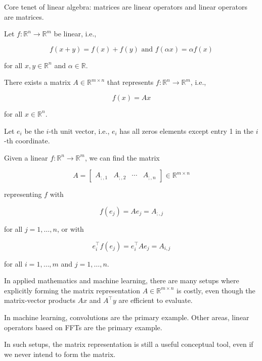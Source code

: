 \documentclass{report}
\begin{document}
\begin{concept}
    Core tenet of linear algebra: matrices are linear operators and linear operators are matrices.

    Let $f: \mathbb{R}^{n} \rightarrow \mathbb{R}^{m}$ be linear, i.e.,

    $$
    f(x+y)=f(x)+f(y) \text { and } f(\alpha x)=\alpha f(x)
    $$

    for all $x, y \in \mathbb{R}^{n}$ and $\alpha \in \mathbb{R}$.

    There exists a matrix $A \in \mathbb{R}^{m \times n}$ that represents $f: \mathbb{R}^{n} \rightarrow \mathbb{R}^{m}$, i.e.,

    $$
    f(x)=A x
    $$

    for all $x \in \mathbb{R}^{n}$.

    Let $e_{i}$ be the $i$-th unit vector, i.e., $e_{i}$ has all zeros elements except entry 1 in the $i$-th coordinate.

    Given a linear $f: \mathbb{R}^{n} \rightarrow \mathbb{R}^{m}$, we can find the matrix

    $$
    A=\left[\begin{array}{llll}
    A_{;, 1} & A_{;, 2} & \cdots & A_{;, n}
    \end{array}\right] \in \mathbb{R}^{m \times n}
    $$

    representing $f$ with

    $$
    f\left(e_{j}\right)=A e_{j}=A_{;, j}
    $$

    for all $j=1, \ldots, n$, or with

    $$
    e_{i}^{\top} f\left(e_{j}\right)=e_{i}^{\top} A e_{j}=A_{i, j}
    $$

    for all $i=1, \ldots, m$ and $j=1, \ldots, n$.
\end{concept}

\begin{concept}
    In applied mathematics and machine learning, there are many setups where explicitly forming the matrix representation $A \in \mathbb{R}^{m \times n}$ is costly, even though the matrix-vector products $A x$ and $A^{\top} y$ are efficient to evaluate.

    In machine learning, convolutions are the primary example. Other areas, linear operators based on FFTs are the primary example.

    In such setups, the matrix representation is still a useful conceptual tool, even if we never intend to form the matrix.
\end{concept}
\end{document}
